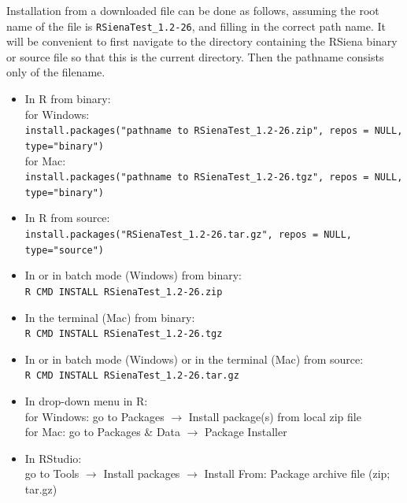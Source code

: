 \documentclass[a4paper,fleqn,11pt]{article}
\newcommand{\+}{\, + \,}
\newcommand{\sfn}[1]{\textsf{#1}}
\newcommand{\R}{{\sf R }}
\newcommand{\Rn}{{\sf R}}
\newcommand{\RS}{{\sf RSiena }}
\begin{document}
\begin{enumerate}
            Installation from a downloaded file can be done as follows, assuming
            the root name of the file is \texttt{RSienaTest\_1.2-26}, and filling in the correct path name.
            It will be convenient to first navigate to the directory
            containing the \RS binary or source file so that this is the current directory.
            Then the pathname consists only of the filename.
            \begin{itemize}
            \item In \R from binary:\\
            for Windows:\\
             \texttt{install.packages("pathname to RSienaTest\_1.2-26.zip", repos = NULL, type="binary")}\\
            for Mac:\\
             \texttt{install.packages("pathname to RSienaTest\_1.2-26.tgz", repos = NULL, type="binary")}
             \item In \R from source:\\
            \texttt{install.packages("RSienaTest\_1.2-26.tar.gz", repos = NULL, type="source")}
            \item In  or in batch mode (Windows) from binary:\\
            \texttt{R CMD INSTALL RSienaTest\_1.2-26.zip}
            \item In the terminal (Mac) from binary:\\
            \texttt{R CMD INSTALL RSienaTest\_1.2-26.tgz}
            \item In  or in batch mode (Windows) or in the terminal (Mac) from source:\\
            \texttt{R CMD INSTALL RSienaTest\_1.2-26.tar.gz}
            \item In drop-down menu in \Rn:\\
            for Windows:  go to Packages  $\rightarrow$ Install package(s) from local zip file\\
            for Mac:  go to Packages \& Data $\rightarrow$ Package Installer
            \item In \sfn{RStudio}:\\
            go to Tools  $\rightarrow$ Install packages $\rightarrow$ Install From: Package archive file (zip; tar.gz)
            \end{itemize}
   \end{enumerate}
\end{document}
